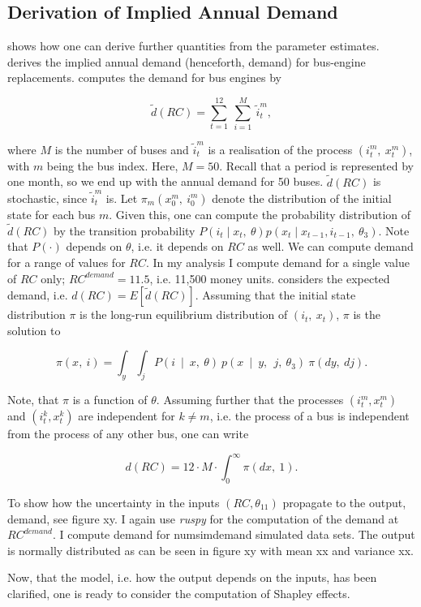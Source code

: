 \subsection{Derivation of Implied Annual Demand}

\citet{R87} shows how one can derive further quantities from the parameter estimates. \citet{R87} derives the implied annual demand (henceforth, demand) for bus-engine replacements. \citet{R87} computes the demand for bus engines by

\begin{equation}
\tilde{d}(RC)=\sum_{t=1}^{12}\ \sum_{i=1}^{M}\ {\tilde{i}}_t^m,
\end{equation}

where $M$ is the number of buses and ${\tilde{i}}_t^m$ is a realisation of the process $(i_t^m,\ x_t^m)$, with $m$ being the bus index. Here, $M=50$. Recall that a period is represented by one month, so we end up with the annual demand for 50 buses. $\tilde{d}(RC)$ is stochastic, since ${\tilde{i}}_t^m$ is. Let $\pi_m(x_0^m,\ i_0^m)$ denote the distribution of the initial state for each bus $m$. Given this, one can compute the probability distribution of $\tilde{d}(RC) $ by the transition probability $P(i_t \mid x_t,\ \theta)p(x_t \mid x_{t-1}, i_{t-1},\ \theta_3) $. Note that $P(\cdot)$ depends on $\theta$, i.e. it depends on $RC$ as well. We can compute demand for a range of values for $RC$. In my analysis I compute demand for a single value of $RC$ only; $RC^{demand}=11.5$, i.e. 11,500 money units. \citet{R87} considers the expected demand, i.e. $d(RC)=E[\tilde{d}(RC)]$. Assuming that the initial state distribution $\pi$ is the long-run equilibrium distribution of $(i_t,\ x_t)$, $\pi$ is the solution to

\begin{equation}
\pi(x,\ i)=\int_y \int_j P(i\ \mid\ x,\ \theta)\ p(x\ \mid\ y,\ \ j,\ \theta_3)\ \pi(dy,\ dj).
\end{equation}

Note, that $\pi$ is a function of $\theta$. Assuming further that the processes $ (i_t^m, x_t^m)$ and $(i_t^k, x_t^k)$ are independent for $k \neq m$, i.e. the process of a bus is independent from the process of any other bus, one can write

\begin{equation}
d(RC)=12 \cdot M \cdot \int_0^{\infty} \pi(dx,\ 1).
\end{equation}

To show how the uncertainty in the inputs $(RC, \theta_{11})$ propagate to the output, demand, see figure xy. I again use \textit{ruspy} for the computation of the demand at $RC^{demand}$. I compute demand for numsimdemand simulated data sets. The output is normally distributed as can be seen in figure xy with mean xx and variance xx.

Now, that the model, i.e. how the output depends on the inputs, has been clarified, one is ready to consider the computation of Shapley effects.
